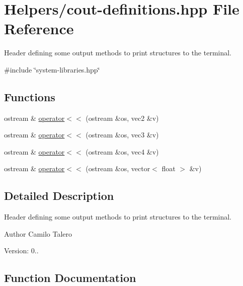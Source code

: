 \hypertarget{cout-definitions_8hpp}{}\section{Helpers/cout-\/definitions.hpp File Reference}
\label{cout-definitions_8hpp}


Header defining some output methods to print structures to the terminal.  


{\ttfamily \#include \char`\"{}system-\/libraries.\+hpp\char`\"{}}\newline
\subsection*{Functions}
\begin{DoxyCompactItemize}
\item 
ostream \& \mbox{\hyperlink{cout-definitions_8hpp_a423721485bc58bbd87f25262fc5748b7}{operator$<$$<$}} (ostream \&os, vec2 \&v)
\item 
ostream \& \mbox{\hyperlink{cout-definitions_8hpp_a9785ea3eade9968a62d5e9836f720617}{operator$<$$<$}} (ostream \&os, vec3 \&v)
\item 
ostream \& \mbox{\hyperlink{cout-definitions_8hpp_aced74fdd5c32b973692a20e6272a5f56}{operator$<$$<$}} (ostream \&os, vec4 \&v)
\item 
ostream \& \mbox{\hyperlink{cout-definitions_8hpp_a337249c538c5d8304a68a31ecc936c81}{operator$<$$<$}} (ostream \&os, vector$<$ float $>$ \&v)
\end{DoxyCompactItemize}


\subsection{Detailed Description}
Header defining some output methods to print structures to the terminal. 

\begin{DoxyAuthor}{Author}
Camilo Talero
\end{DoxyAuthor}
Version\+: 0.. 

\subsection{Function Documentation}
\mbox{\label{cout-definitions_8hpp_a423721485bc58bbd87f25262fc5748b7}} 
